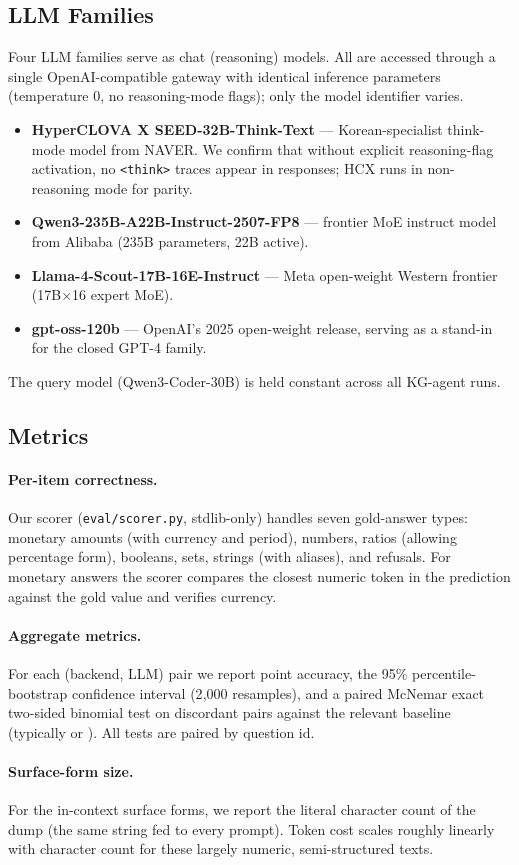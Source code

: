\subsection{LLM Families}

Four LLM families serve as chat (reasoning) models. All are accessed
through a single OpenAI-compatible gateway with identical inference
parameters (temperature 0, no reasoning-mode flags); only the model
identifier varies.

\begin{itemize}
\item \textbf{HyperCLOVA X SEED-32B-Think-Text} — Korean-specialist
      think-mode model from NAVER. We confirm that without explicit
      reasoning-flag activation, no \texttt{<think>} traces appear in
      responses; HCX runs in non-reasoning mode for parity.
\item \textbf{Qwen3-235B-A22B-Instruct-2507-FP8} — frontier MoE
      instruct model from Alibaba (235B parameters, 22B active).
\item \textbf{Llama-4-Scout-17B-16E-Instruct} — Meta open-weight
      Western frontier (17B$\times$16 expert MoE).
\item \textbf{gpt-oss-120b} — OpenAI's 2025 open-weight release,
      serving as a stand-in for the closed GPT-4 family.
\end{itemize}

The query model (Qwen3-Coder-30B) is held constant across all KG-agent
runs.

\subsection{Metrics}

\paragraph{Per-item correctness.} Our scorer (\texttt{eval/scorer.py},
stdlib-only) handles seven gold-answer types: monetary amounts (with
currency and period), numbers, ratios (allowing percentage form),
booleans, sets, strings (with aliases), and refusals. For monetary
answers the scorer compares the closest numeric token in the
prediction against the gold value and verifies currency.

\paragraph{Aggregate metrics.}
For each (backend, LLM) pair we report point accuracy, the 95\%
percentile-bootstrap confidence interval (2{,}000 resamples), and a
paired McNemar exact two-sided binomial test on discordant pairs
against the relevant baseline (typically  or
). All tests are paired by question id.

\paragraph{Surface-form size.} For the in-context surface forms, we
report the literal character count of the dump (the same string fed
to every prompt). Token cost scales roughly linearly with character
count for these largely numeric, semi-structured texts.
